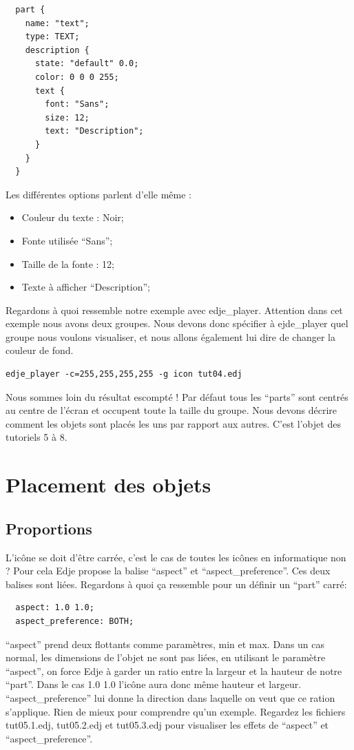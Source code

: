 \documentclass[a4paper]{efr}
\begin{document}
\begin{lstlisting}
  part {
    name: "text";
    type: TEXT;
    description {
      state: "default" 0.0;
      color: 0 0 0 255;
      text {
        font: "Sans";
        size: 12;
        text: "Description";
      }
    }
  }
\end{lstlisting}

Les différentes options parlent d'elle même :
\begin{itemize}
\item Couleur du texte : Noir;
\item Fonte utilisée ``Sans'';
\item Taille de la fonte : 12;
\item Texte à afficher ``Description'';
\end{itemize}

Regardons à quoi ressemble notre exemple avec edje\_player. Attention dans cet
exemple nous avons deux groupes. Nous devons donc spécifier à ejde\_player quel
groupe nous voulons visualiser, et nous allons également lui dire de changer la
couleur de fond.

\begin{lstlisting}
edje_player -c=255,255,255,255 -g icon tut04.edj
\end{lstlisting}

Nous sommes loin du résultat escompté ! Par défaut tous les ``parts'' sont
centrés au centre de l'écran et occupent toute la taille du groupe. Nous devons
décrire comment les objets sont placés les uns par rapport aux autres.
C'est l'objet des tutoriels 5 à 8.


\section{Placement des objets}
\subsection{Proportions}

L'icône se doit d'être carrée, c'est le cas de toutes les icônes en informatique
non ?  Pour cela Edje propose la balise ``aspect'' et ``aspect\_preference''. Ces deux
balises sont liées. Regardons à quoi ça ressemble pour un définir un ``part'' carré:
\begin{lstlisting}
  aspect: 1.0 1.0;
  aspect_preference: BOTH;
\end{lstlisting}

``aspect'' prend deux flottants comme paramètres, min et max. Dans un cas normal,
les dimensions de l'objet ne sont pas liées, en utilisant le paramètre ``aspect'',
on force Edje à garder un ratio entre la largeur et la hauteur de notre ``part''.
Dans le cas 1.0 1.0 l'icône aura donc même hauteur et largeur.
``aspect\_preference'' lui donne la direction dans laquelle on veut que ce ration s'applique.
Rien de mieux pour comprendre qu'un exemple. Regardez les fichiers tut05.1.edj,
tut05.2.edj et tut05.3.edj pour visualiser les effets de ``aspect'' et
``aspect\_preference''.
\end{document}
